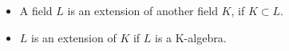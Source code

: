 \documentclass[11pt]{article}
\theoremstyle{plain}
\theoremstyle{definition}
\begin{document}
\begin{itemize}
  \item A field $L$ is an extension of another field $K$, if $K \subset L$. 
  \item $L$ is an extension of $K$ if $L$ is a K-algebra.
\end{itemize}


% 
% 
% 
% 

 
 
\end{document}
